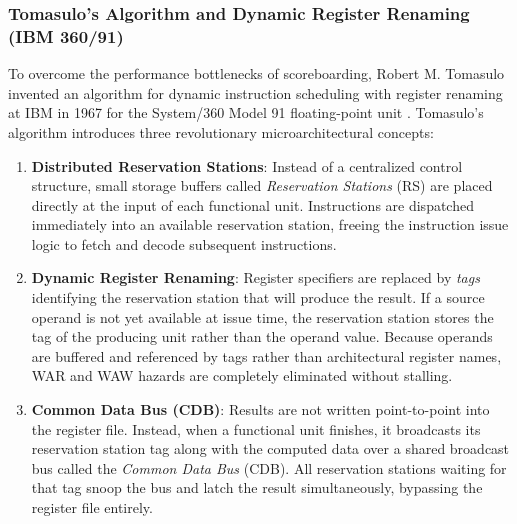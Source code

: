 \subsubsection{Tomasulo's Algorithm and Dynamic Register Renaming (IBM 360/91)}\label{sec:tomasulo}

To overcome the performance bottlenecks of scoreboarding, Robert M. Tomasulo invented an algorithm for dynamic instruction scheduling with register renaming at IBM in 1967 for the System/360 Model 91 floating-point unit \cite{tomasulo1967}. Tomasulo's algorithm introduces three revolutionary microarchitectural concepts:
\begin{enumerate}
    \item \textbf{Distributed Reservation Stations}: Instead of a centralized control structure, small storage buffers called \emph{Reservation Stations} (RS) are placed directly at the input of each functional unit. Instructions are dispatched immediately into an available reservation station, freeing the instruction issue logic to fetch and decode subsequent instructions.
    
    \item \textbf{Dynamic Register Renaming}: Register specifiers are replaced by \emph{tags} identifying the reservation station that will produce the result. If a source operand is not yet available at issue time, the reservation station stores the tag of the producing unit rather than the operand value. Because operands are buffered and referenced by tags rather than architectural register names, WAR and WAW hazards are completely eliminated without stalling.
    
    \item \textbf{Common Data Bus (CDB)}: Results are not written point-to-point into the register file. Instead, when a functional unit finishes, it broadcasts its reservation station tag along with the computed data over a shared broadcast bus called the \emph{Common Data Bus} (CDB). All reservation stations waiting for that tag snoop the bus and latch the result simultaneously, bypassing the register file entirely.
\end{enumerate}

